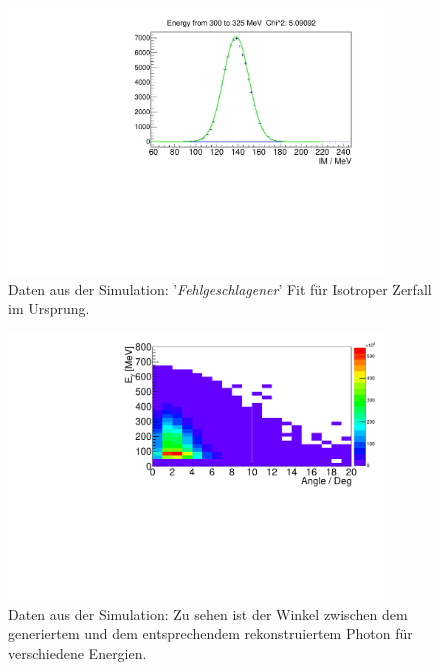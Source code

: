 \documentclass[a4paper,11pt,oneside,final,german,openbib,pdftex]{scrbook}
\begin{document}
{\begin{appendix}
\begin{figure}[h!]
\end{figure}


\begin{figure}[h!]
	\begin{center}
		\includegraphics[width=100mm]{20172804IsotropUrsprungFitFail}
		\end{center}
	\caption[Fehlgeschlagener Fit Isotrop Urspung]{Daten aus der Simulation: '\textit{Fehlgeschlagener}' Fit f\"ur Isotroper Zerfall im Ursprung.}
	\label{fig:Isotrop-Fit-Fail}
\end{figure}



\begin{figure}[h!]
	\begin{center}
		\includegraphics[width=100mm]{AngleRegGen/20171804TrueCandsAngleDeviation}
		\caption[Simulation: Winkel zwischen gen. und rek. Photon]{Daten aus der Simulation: Zu sehen ist der Winkel zwischen dem generiertem und dem entsprechendem rekonstruiertem Photon f\"ur verschiedene Energien.}
		\label{fig:Angle-Rec-Gen-Hist}
	\end{center}
\end{figure}






\end{appendix}}
\end{document}
